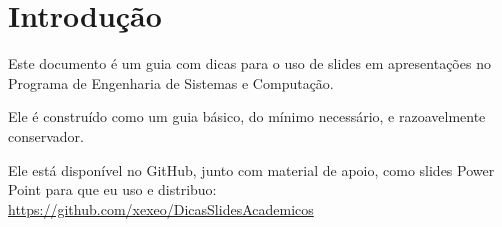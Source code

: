 \section{Introdução}

Este documento é um guia com dicas para o uso de slides em apresentações no Programa de Engenharia de Sistemas e Computação.

Ele é construído como um guia básico, do mínimo necessário, e razoavelmente conservador.

Ele está disponível no GitHub, junto com material de apoio, como slides Power Point para que eu uso e distribuo: \url{https://github.com/xexeo/DicasSlidesAcademicos}

